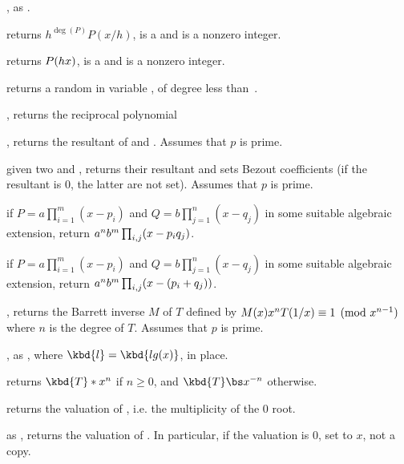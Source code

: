, as .

 returns $h^{\deg(P)} P(x/h)$,
 is a  and  is a nonzero integer.

 returns $P(h\*x)$,
 is a  and  is a nonzero integer.

 returns a random 
in variable , of degree less than~.

, returns the reciprocal polynomial

, returns the resultant
of  and . Assumes that $p$ is prime.


given two   and ,
returns their resultant and sets Bezout coefficients (if the resultant is $0$,
the latter are not set). Assumes that $p$ is prime.


 if
$P=a\prod_{i=1}^m(x-p_i)$ and $Q=b\prod_{j=1}^n(x-q_j)$ in some suitable
algebraic extension, return $a^n\*b^m\prod_{i,j}(x-p_i\*q_j)$.

 if
$P=a\prod_{i=1}^m(x-p_i)$ and $Q=b\prod_{j=1}^n(x-q_j)$ in some suitable
algebraic extension, return $a^n\*b^m\prod_{i,j}(x-(p_i+q_j))$.

, returns the Barrett inverse
$M$ of $T$ defined by $M(x)\*x^n\*T(1/x)\equiv 1\pmod{x^{n-1}}$ where $n$ is
the degree of $T$. Assumes that $p$ is prime.

, as , where
$\kbd{l} = \kbd{lg(x)}$, in place.

 returns $\kbd{T} * x^n$ if $n\geq 0$,
and $\kbd{T} \bs x^{-n}$ otherwise.

 returns the valuation of , i.e. the
multiplicity of the $0$ root.

 as , returns the
valuation of . In particular, if the valuation is $0$, set 
to $x$, not a copy.

